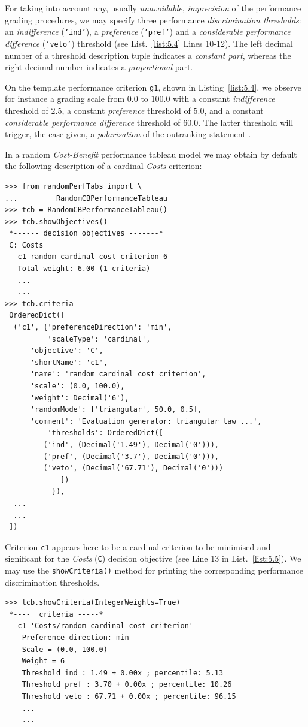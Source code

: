 For taking into account any, usually \emph{unavoidable}, \emph{imprecision} of the performance grading procedures, we may specify three performance \emph{discrimination thresholds}: an \emph{indifference} (\texttt{'ind'}), a \emph{preference} (\texttt{'pref'}) and a \emph{considerable performance difference} (\texttt{'veto'}) threshold (see List.~\vref{list:5.4} Lines 10-12). The left decimal number of a threshold description tuple indicates a \emph{constant part}, whereas the right decimal number indicates a \emph{proportional} part.

On the template performance criterion \texttt{g1}, shown in Listing~\vref{list:5.4}, we observe for instance a grading scale from $0.0$ to $100.0$ with a constant \emph{indifference} threshold of $2.5$, a constant \emph{preference} threshold of $5.0$, and a constant \emph{considerable performance difference} threshold of $60.0$. The latter threshold  will trigger, the case given, a \emph{polarisation} of the outranking statement \citep{BIS-2013}.

In a random \emph{Cost-Benefit} performance tableau model we may obtain by default the following description of a cardinal \emph{Costs} criterion:
\begin{lstlisting}[caption={Example of cardinal \emph{Costs} criterion},label=list:5.5]
>>> from randomPerfTabs import \
...         RandomCBPerformanceTableau
>>> tcb = RandomCBPerformanceTableau()
>>> tcb.showObjectives()
 *------ decision objectives -------*
 C: Costs
   c1 random cardinal cost criterion 6
   Total weight: 6.00 (1 criteria)
   ...
   ...
>>> tcb.criteria
 OrderedDict([
  ('c1', {'preferenceDirection': 'min',
          'scaleType': 'cardinal',
	  'objective': 'C',
	  'shortName': 'c1',
	  'name': 'random cardinal cost criterion',
	  'scale': (0.0, 100.0),
	  'weight': Decimal('6'),
	  'randomMode': ['triangular', 50.0, 0.5],
	  'comment': 'Evaluation generator: triangular law ...',
          'thresholds': OrderedDict([
	     ('ind', (Decimal('1.49'), Decimal('0'))),
	     ('pref', (Decimal('3.7'), Decimal('0'))),
	     ('veto', (Decimal('67.71'), Decimal('0')))
             ])
           }),
  ...
  ...
 ])
\end{lstlisting}

Criterion \texttt{c1} appears here to be a cardinal criterion to be minimised and significant for the \emph{Costs} (\texttt{C}) decision objective (see Line 13 in List.~\vref{list:5.5}). We may use the \texttt{showCriteria()} method for printing the corresponding performance discrimination thresholds.
\begin{lstlisting}
>>> tcb.showCriteria(IntegerWeights=True)
 *----  criteria -----*
   c1 'Costs/random cardinal cost criterion'
    Preference direction: min
    Scale = (0.0, 100.0)
    Weight = 6 
    Threshold ind : 1.49 + 0.00x ; percentile: 5.13
    Threshold pref : 3.70 + 0.00x ; percentile: 10.26
    Threshold veto : 67.71 + 0.00x ; percentile: 96.15
    ...
    ...
\end{lstlisting}


